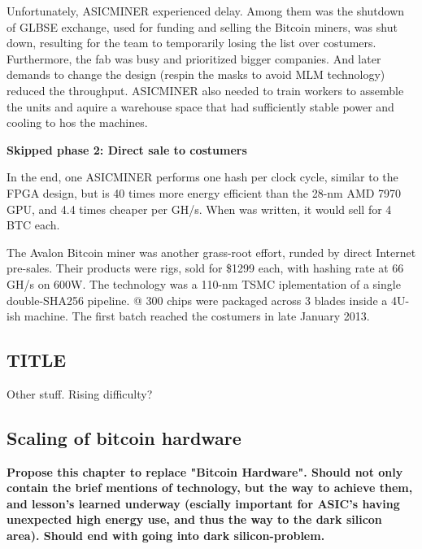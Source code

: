 Unfortunately, ASICMINER experienced delay.
Among them was the shutdown of GLBSE exchange, used for funding and selling the Bitcoin miners, was shut down, resulting for the team to temporarily losing the list over costumers.
Furthermore, the fab was busy and prioritized bigger companies.
And later demands to change the design (respin the masks to avoid MLM technology) reduced the throughput.
ASICMINER also needed to train workers to assemble the units and aquire a warehouse space that had sufficiently stable power and cooling to hos the machines.

\textbf{Skipped phase 2: Direct sale to costumers}

In the end, one ASICMINER performs one hash per clock cycle, similar to the FPGA design, but is 40 times more energy efficient than the 28-nm AMD 7970 GPU, and 4.4 times cheaper per GH/s.
When \cite{bespoke-silicon} was written, it would sell for 4 BTC each.

The Avalon Bitcoin miner was another grass-root effort, runded by direct Internet pre-sales.
Their products were rigs, sold for \$1299 each, with hashing rate at 66 GH/s on 600W.
The technology was a 110-nm TSMC iplementation of a single double-SHA256 pipeline. @
300 chips were packaged across 3 blades inside a 4U-ish machine.
The first batch reached the costumers in late January 2013.

\cite{bespoke-silicon}

\subsection{TITLE}
Other stuff.
Rising difficulty?

\subsection{Scaling of bitcoin hardware}


\textbf{Propose this chapter to replace "Bitcoin Hardware". Should not only contain the brief mentions of technology, but the way to achieve them, and lesson's learned underway (escially important for ASIC's having unexpected high energy use, and thus the way to the dark silicon area). Should end with going into dark silicon-problem.}


